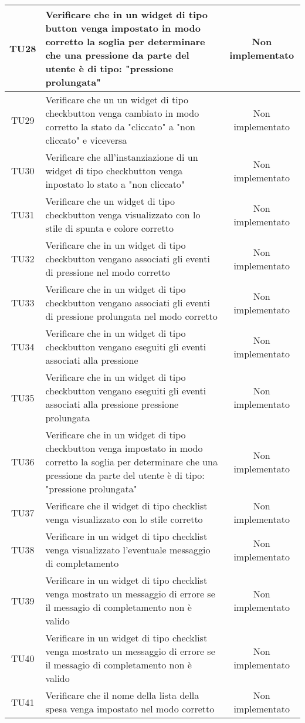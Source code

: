 \begin{center}
\begin{longtable}{|c|>{\centering}m{10cm}|c|}
		TU28 & Verificare che in un widget di tipo button venga impostato in modo corretto la soglia per determinare che una pressione da parte del utente è di tipo: "pressione prolungata" & Non implementato \\ \hline
		TU29 & Verificare che un un widget di tipo checkbutton venga cambiato in modo corretto la stato da "cliccato" a "non cliccato" e viceversa & Non implementato \\ \hline
		TU30 & Verificare che all'instanziazione di un widget di tipo checkbutton venga inpostato lo stato a "non cliccato" & Non implementato \\ \hline
		TU31 & Verificare che un widget di tipo checkbutton venga visualizzato con lo stile di spunta e colore corretto & Non implementato \\ \hline
		TU32 & Verificare che in un widget di tipo checkbutton vengano associati gli eventi di pressione nel modo corretto & Non implementato \\ \hline
		TU33 & Verificare che in un widget di tipo checkbutton vengano associati gli eventi di pressione prolungata nel modo corretto & Non implementato \\ \hline
		TU34 & Verificare che in un widget di tipo checkbutton vengano eseguiti gli eventi associati alla pressione & Non implementato \\ \hline
		TU35 & Verificare che in un widget di tipo checkbutton vengano eseguiti gli eventi associati alla pressione pressione prolungata & Non implementato \\ \hline
		TU36 & Verificare che in un widget di tipo checkbutton venga impostato in modo corretto la soglia per determinare che una pressione da parte del utente è di tipo: "pressione prolungata" & Non implementato \\ \hline
		TU37 & Verificare che il widget di tipo checklist venga visualizzato con lo stile corretto & Non implementato \\ \hline
		TU38 & Verificare in un widget di tipo checklist venga visualizzato l'eventuale messaggio di completamento & Non implementato \\ \hline
		TU39 & Verificare in un widget di tipo checklist venga mostrato un messaggio di errore se il messagio di completamento non è valido & Non implementato \\ \hline
		TU40 & Verificare in un widget di tipo checklist venga mostrato un messaggio di errore se il messagio di completamento non è valido & Non implementato \\ \hline
		TU41 & Verificare che il nome della lista della spesa venga impostato nel modo corretto & Non implementato \\ \hline

\end{longtable}
\end{center}
